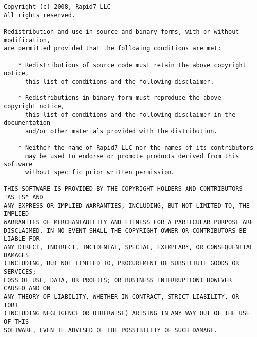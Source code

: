 \documentclass{report}
\begin{document}
{\footnotesize
\begin{verbatim}
Copyright (c) 2008, Rapid7 LLC
All rights reserved.

Redistribution and use in source and binary forms, with or without modification,
are permitted provided that the following conditions are met:

    * Redistributions of source code must retain the above copyright notice, 
	  this list of conditions and the following disclaimer.

    * Redistributions in binary form must reproduce the above copyright notice,
	  this list of conditions and the following disclaimer in the documentation
	  and/or other materials provided with the distribution.

    * Neither the name of Rapid7 LLC nor the names of its contributors 
	  may be used to endorse or promote products derived from this software 
	  without specific prior written permission.

THIS SOFTWARE IS PROVIDED BY THE COPYRIGHT HOLDERS AND CONTRIBUTORS "AS IS" AND
ANY EXPRESS OR IMPLIED WARRANTIES, INCLUDING, BUT NOT LIMITED TO, THE IMPLIED 
WARRANTIES OF MERCHANTABILITY AND FITNESS FOR A PARTICULAR PURPOSE ARE 
DISCLAIMED. IN NO EVENT SHALL THE COPYRIGHT OWNER OR CONTRIBUTORS BE LIABLE FOR
ANY DIRECT, INDIRECT, INCIDENTAL, SPECIAL, EXEMPLARY, OR CONSEQUENTIAL DAMAGES
(INCLUDING, BUT NOT LIMITED TO, PROCUREMENT OF SUBSTITUTE GOODS OR SERVICES; 
LOSS OF USE, DATA, OR PROFITS; OR BUSINESS INTERRUPTION) HOWEVER CAUSED AND ON
ANY THEORY OF LIABILITY, WHETHER IN CONTRACT, STRICT LIABILITY, OR TORT 
(INCLUDING NEGLIGENCE OR OTHERWISE) ARISING IN ANY WAY OUT OF THE USE OF THIS
SOFTWARE, EVEN IF ADVISED OF THE POSSIBILITY OF SUCH DAMAGE.
\end{verbatim}}
\end{document}
